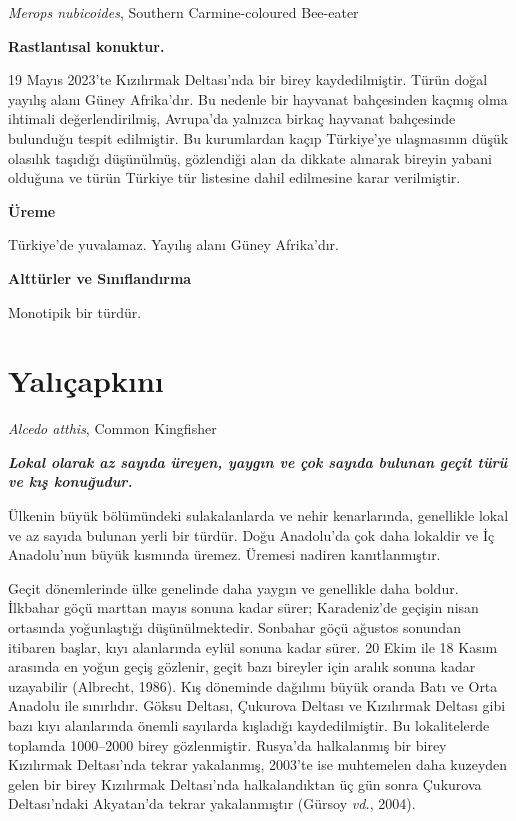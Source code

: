 \documentclass[
  10.5pt,
  a4paper,
  DIV=11,
  numbers=noendperiod,
  twocolumn]{scrreprt}
\begin{document}
\emph{Merops nubicoides}, Southern Carmine-coloured Bee-eater

\textbf{Rastlantısal konuktur.}

19 Mayıs 2023'te Kızılırmak Deltası'nda bir birey kaydedilmiştir. Türün
doğal yayılış alanı Güney Afrika'dır. Bu nedenle bir hayvanat
bahçesinden kaçmış olma ihtimali değerlendirilmiş, Avrupa'da yalnızca
birkaç hayvanat bahçesinde bulunduğu tespit edilmiştir. Bu kurumlardan
kaçıp Türkiye'ye ulaşmasının düşük olasılık taşıdığı düşünülmüş,
gözlendiği alan da dikkate alınarak bireyin yabani olduğuna ve türün
Türkiye tür listesine dahil edilmesine karar verilmiştir.

\textbf{Üreme}

Türkiye'de yuvalamaz. Yayılış alanı Güney Afrika'dır.

\textbf{Alttürler ve Sınıflandırma}

Monotipik bir türdür.

\section{Yalıçapkını}\label{yalux131uxe7apkux131nux131}

\emph{Alcedo atthis}, Common Kingfisher

\textbf{\emph{Lokal olarak az sayıda üreyen, yaygın ve çok sayıda
bulunan geçit türü ve kış konuğudur.}}

Ülkenin büyük bölümündeki sulakalanlarda ve nehir kenarlarında,
genellikle lokal ve az sayıda bulunan yerli bir türdür. Doğu Anadolu'da
çok daha lokaldir ve İç Anadolu'nun büyük kısmında üremez. Üremesi
nadiren kanıtlanmıştır.

Geçit dönemlerinde ülke genelinde daha yaygın ve genellikle daha boldur.
İlkbahar göçü marttan mayıs sonuna kadar sürer; Karadeniz'de geçişin
nisan ortasında yoğunlaştığı düşünülmektedir. Sonbahar göçü ağustos
sonundan itibaren başlar, kıyı alanlarında eylül sonuna kadar sürer. 20
Ekim ile 18 Kasım arasında en yoğun geçiş gözlenir, geçit bazı bireyler
için aralık sonuna kadar uzayabilir (Albrecht, 1986). Kış döneminde
dağılımı büyük oranda Batı ve Orta Anadolu ile sınırlıdır. Göksu
Deltası, Çukurova Deltası ve Kızılırmak Deltası gibi bazı kıyı
alanlarında önemli sayılarda kışladığı kaydedilmiştir. Bu lokalitelerde
toplamda 1000--2000 birey gözlenmiştir. Rusya'da halkalanmış bir birey
Kızılırmak Deltası'nda tekrar yakalanmış, 2003'te ise muhtemelen daha
kuzeyden gelen bir birey Kızılırmak Deltası'nda halkalandıktan üç gün
sonra Çukurova Deltası'ndaki Akyatan'da tekrar yakalanmıştır (Gürsoy
\emph{vd.}, 2004).
\end{document}
